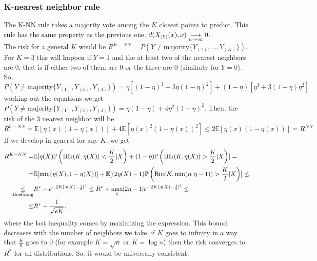 \documentclass[11pt, english]{article}
\begin{document}
\subsubsection{K-nearest neighbor rule}

The K-NN rule takes a majority vote among the $K$ closest points to predict. This rule has the same property as the previous one, $d(X_{(k)}(x),x)\underset{\scriptsize{n\rightarrow \infty}}{\longrightarrow}0$. \\

The risk for a general $K$ would be $R^{K-NN}=P(Y\neq \text{majority}\{Y_{(1)},\dots,Y_{(K)}\})$. For $K=3$ this will happen if $Y=1$ and the at least two of the nearest neighbors are 0, that is if either two of them are 0 or the three are 0 (similarly for $Y=0$). So, $P(Y\neq \text{majority}\{Y_{(1)},Y_{(3)},Y_{(3)}\})=\eta[(1-\eta)^3+3\eta(1-\eta)^2]+(1-\eta)[\eta^3+3(1-\eta)\eta^2]$ working out the equations we get $P(Y\neq \text{majority}\{Y_{(1)},Y_{(3)},Y_{(3)}\})=\eta(1-\eta)+4\eta^2(1-\eta)^2$. Then, the risk of the 3 nearest neighbor will be
\begin{equation}
	R^{3-NN}=\mathbb{E}[\eta(x) (1-\eta(x))]+4\mathbb{E}[\eta(x)^2(1-\eta(x))^2]\leq2\mathbb{E}[\eta(x)(1-\eta(x))]=R^{NN}
\end{equation}
If we develop in general for any $K$, we get
\begin{align}
	R^{K-NN} = &\mathbb{E}[\eta(X)\mathbb{P}\left(\text{Bin}(K,\eta(X))<\frac{K}{2}|X\right)+(1-\eta)\mathbb{P}\left(\text{Bin}(K,\eta(X))>\frac{K}{2}|X\right)]=\\
	= & \mathbb{E}[\min(\eta(X),1-\eta(X))]+\mathbb{E}[(2\eta(X)-1)\mathbb{P}\left(\text{Bin}(K,\min(\eta,\eta-1))>\frac{K}{2}|X\right)]\leq\\
	\underset{\scriptsize{\text{Hoeffding}}}{\leq} & R^*+e^{-2K|\eta(X)-\frac{1}{2}|^2}\leq R^*+\underset{\eta}{\max}|2\eta-1|e^{-2K|\eta(X)-\frac{1}{2}|^2}\leq\\
	\leq & R^*+\frac{1}{\sqrt{eK}},
\end{align}
where the last inequality comes by maximizing the expression. This bound decreases with the number of neighbors we take, if $K$ goes to infinity in a way that $\frac{K}{n}$ goes to 0 (for example $K=\sqrt{n}$ or $K=\log n$) then the risk converges to $R^*$ for all distributions. So, it would be universally consistent. \\
\end{document}

